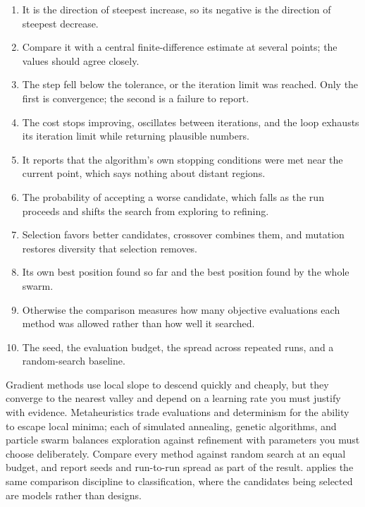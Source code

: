 
\begin{enumerate}
    \item It is the direction of steepest increase, so its negative is the
          direction of steepest decrease.
    \item Compare it with a central finite-difference estimate at several
          points; the values should agree closely.
    \item The step fell below the tolerance, or the iteration limit was reached.
          Only the first is convergence; the second is a failure to report.
    \item The cost stops improving, oscillates between iterations, and the loop
          exhausts its iteration limit while returning plausible numbers.
    \item It reports that the algorithm's own stopping conditions were met near
          the current point, which says nothing about distant regions.
    \item The probability of accepting a worse candidate, which falls as the run
          proceeds and shifts the search from exploring to refining.
    \item Selection favors better candidates, crossover combines them, and
          mutation restores diversity that selection removes.
    \item Its own best position found so far and the best position found by the
          whole swarm.
    \item Otherwise the comparison measures how many objective evaluations each
          method was allowed rather than how well it searched.
    \item The seed, the evaluation budget, the spread across repeated runs, and
          a random-search baseline.
\end{enumerate}

\begin{tcolorbox}[title=Chapter summary,colframe=orange,colback=white,arc=2mm]
Gradient methods use local slope to descend quickly and cheaply, but they
converge to the nearest valley and depend on a learning rate you must justify
with evidence. Metaheuristics trade evaluations and determinism for the ability
to escape local minima; each of simulated annealing, genetic algorithms, and
particle swarm balances exploration against refinement with parameters you must
choose deliberately. Compare every method against random search at an equal
budget, and report seeds and run-to-run spread as part of the result.
 applies the same comparison discipline to
classification, where the candidates being selected are models rather than
designs.
\end{tcolorbox}
